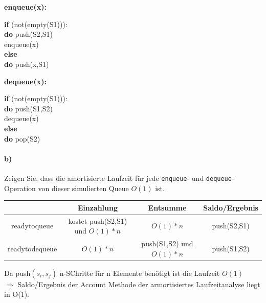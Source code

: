 \documentclass[paper=a4, fontsize=11pt]{scrartcl}
\numberwithin{equation}{section}
\numberwithin{figure}{section}
\numberwithin{table}{section}
\begin{document}
\textbf{enqueue(x):} \\
\begin{algorithm}[H]
\SetAlgoLined
\textbf{if} (not(empty(S1))): \\
\textbf{do} push(S2,S1) \\
enqueue(x)\\
\textbf{else} \\
\textbf{do} push(x,S1)
\end{algorithm}

\textbf{dequeue(x):} \\
\begin{algorithm}[H]
\SetAlgoLined
\textbf{if} (not(empty(S1))): \\
\textbf{do} push(S1,S2) \\
dequeue(x) \\
\textbf{else} \\
\textbf{do} pop(S2)
\end{algorithm}


\paragraph{b)} 
Zeigen Sie, dass die amortisierte Laufzeit für jede \texttt{enqueue}- und
\texttt{dequeue}-Operation von dieser simulierten Queue $O(1)$ ist. \\

\begin{tabular}{c|c|c|c}
& Einzahlung & Entsumme & Saldo/Ergebnis \\\hline
readytoqueue & kostet push(S2,S1) und $O(1)*n$ & $O(1)*n$ & push(S2,S1) \\\hline
readytodequeue & $O(1)*n$ & push(S1,S2) und $O(1)*n$ & push(S1,S2)
\end{tabular}

Da push$(s_{i},s_{j})$ n-SChritte für n Elemente benötigt ist die Laufzeit $O(1)$ \\
$\Rightarrow$ Saldo/Ergebnis der Account Methode der armortisiertes Laufzeitanalyse liegt in O(1).
\end{document}
